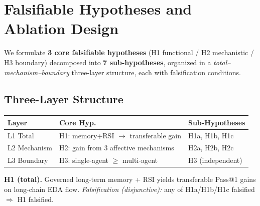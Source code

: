 \section{Falsifiable Hypotheses and Ablation Design}
\label{sec:hypotheses}

We formulate \textbf{3 core falsifiable hypotheses} (H1 functional / H2 mechanistic / H3 boundary) decomposed into \textbf{7 sub-hypotheses}, organized in a \emph{total--mechanism--boundary} three-layer structure, each with falsification conditions.

\subsection{Three-Layer Structure}

\begin{center}
\small
\begin{tabularx}{\columnwidth}{@{}lXX@{}}
\toprule
\textbf{Layer} & \textbf{Core Hyp.} & \textbf{Sub-Hypotheses} \\
\midrule
L1 Total & H1: memory+RSI $\to$ transferable gain & H1a, H1b, H1c \\
L2 Mechanism & H2: gain from 3 affective mechanisms & H2a, H2b, H2c \\
L3 Boundary & H3: single-agent $\geq$ multi-agent & H3 (independent) \\
\bottomrule
\end{tabularx}
\end{center}

\textbf{H1 (total).} Governed long-term memory + RSI yields transferable Pass@1 gains on long-chain EDA flow. \emph{Falsification (disjunctive):} any of H1a/H1b/H1c falsified $\Rightarrow$ H1 falsified.

